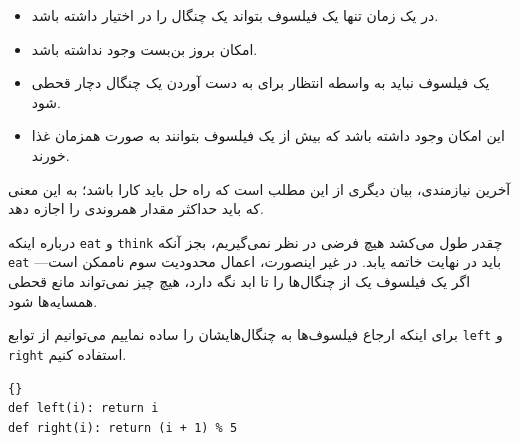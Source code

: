 \documentclass{book}
\begin{document}
\begin{itemize}

\item 
    در یک زمان تنها یک فیلسوف بتواند یک چنگال را در اختیار داشته باشد. 

\item 
    امکان بروز بن‌بست وجود نداشته باشد. 

\item 
    یک فیلسوف نباید به واسطه انتظار برای به دست آوردن یک چنگال دچار قحطی شود. 

\item 
    این امکان وجود داشته باشد که بیش از یک فیلسوف بتوانند به صورت همزمان غذا خورند. 

\end{itemize}

    آخرین نیازمندی، بیان دیگری از این مطلب است که راه حل باید کارا باشد؛ به این معنی که باید حداکثر مقدار همروندی را اجازه دهد. 

    درباره اینکه {\tt eat} و {\tt think} چقدر طول می‌کشد هیچ فرضی  در نظر نمی‌گیریم، بجز آنکه {\tt eat}  باید در نهایت خاتمه یابد. 
    در غیر اینصورت، اعمال محدودیت سوم ناممکن است---اگر یک فیلسوف یک از چنگال‌ها را تا ابد نگه دارد، هیچ چیز نمی‌تواند مانع قحطی همسایه‌ها شود. 
    

    برای اینکه ارجاع فیلسوف‌ها به چنگال‌هایشان را ساده نماییم می‌توانیم از توابع {\tt left} و {\tt right} استفاده کنیم. 

\begin{latin}
\begin{latin}
\begin{lstlisting}[title=\rl{کدام چنگال؟}]{}
def left(i): return i
def right(i): return (i + 1) % 5
\end{lstlisting}
\end{latin}
\end{latin}
\end{document}
